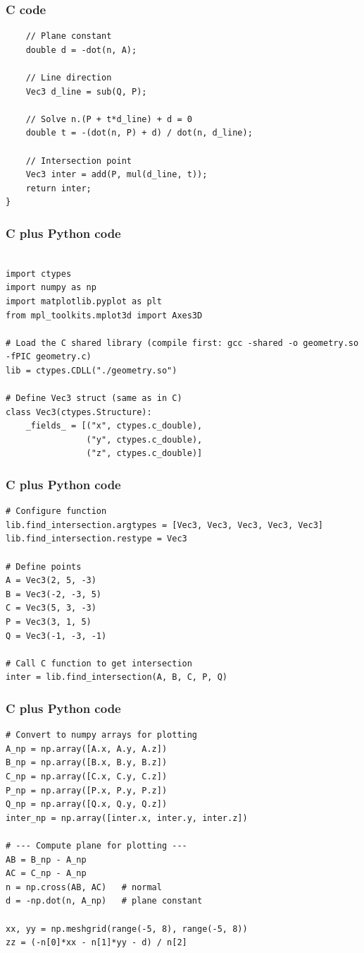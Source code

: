 \documentclass{beamer}
\begin{document}
\begin{frame}[fragile]
    \frametitle{C code}
    \begin{lstlisting}
    // Plane constant
    double d = -dot(n, A);

    // Line direction
    Vec3 d_line = sub(Q, P);

    // Solve n.(P + t*d_line) + d = 0
    double t = -(dot(n, P) + d) / dot(n, d_line);

    // Intersection point
    Vec3 inter = add(P, mul(d_line, t));
    return inter;
}

\end{lstlisting}
 
\end{frame}
\begin{frame}[fragile]
    \frametitle{C plus Python code}
    \begin{lstlisting}

import ctypes
import numpy as np
import matplotlib.pyplot as plt
from mpl_toolkits.mplot3d import Axes3D

# Load the C shared library (compile first: gcc -shared -o geometry.so -fPIC geometry.c)
lib = ctypes.CDLL("./geometry.so")

# Define Vec3 struct (same as in C)
class Vec3(ctypes.Structure):
    _fields_ = [("x", ctypes.c_double),
                ("y", ctypes.c_double),
                ("z", ctypes.c_double)]
\end{lstlisting}
 
\end{frame}
\begin{frame}[fragile]
    \frametitle{C plus Python code}
    \begin{lstlisting}
# Configure function
lib.find_intersection.argtypes = [Vec3, Vec3, Vec3, Vec3, Vec3]
lib.find_intersection.restype = Vec3

# Define points
A = Vec3(2, 5, -3)
B = Vec3(-2, -3, 5)
C = Vec3(5, 3, -3)
P = Vec3(3, 1, 5)
Q = Vec3(-1, -3, -1)

# Call C function to get intersection
inter = lib.find_intersection(A, B, C, P, Q)
\end{lstlisting}
 
\end{frame}
\begin{frame}[fragile]
    \frametitle{C plus Python code}
    \begin{lstlisting}
# Convert to numpy arrays for plotting
A_np = np.array([A.x, A.y, A.z])
B_np = np.array([B.x, B.y, B.z])
C_np = np.array([C.x, C.y, C.z])
P_np = np.array([P.x, P.y, P.z])
Q_np = np.array([Q.x, Q.y, Q.z])
inter_np = np.array([inter.x, inter.y, inter.z])

# --- Compute plane for plotting ---
AB = B_np - A_np
AC = C_np - A_np
n = np.cross(AB, AC)   # normal
d = -np.dot(n, A_np)   # plane constant

xx, yy = np.meshgrid(range(-5, 8), range(-5, 8))
zz = (-n[0]*xx - n[1]*yy - d) / n[2]
\end{lstlisting}
 
\end{frame}
\end{document}
